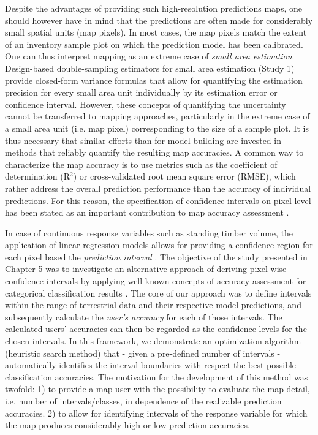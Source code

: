 Despite the advantages of providing such high-resolution predictions maps, one should however have in mind that the predictions are often made for considerably small spatial units (map pixels). In most cases, the map pixels match the extent of an inventory sample plot on which the prediction model has been calibrated. One can thus interpret mapping as an extreme case of \textit{small area estimation}. Design-based double-sampling estimators for small area estimation (Study 1) provide closed-form variance formulas that allow for quantifying the estimation precision for every small area unit individually by its estimation error or confidence interval. However, these concepts of quantifying the uncertainty cannot be transferred to mapping approaches, particularly in the extreme case of a small area unit (i.e. map pixel) corresponding to the size of a sample plot. It is thus necessary that similar efforts than for model building are invested in methods that reliably quantify the resulting map accuracies. A common way to characterize the map accuracy is to use metrics such as the coefficient of determination (R$^2$) or cross-validated root mean square error (RMSE), which rather address the overall prediction performance than the accuracy of individual predictions. For this reason, the specification of confidence intervals on pixel level has been stated as an important contribution to map accuracy assessment \citep{mcroberts2010a}.\par

In case of continuous response variables such as standing timber volume, the application of linear regression models allows for providing a confidence region for each pixel based the \textit{prediction interval} \citep[pp.136--139]{fahrmeir2013}. The objective of the study presented in Chapter 5 was to investigate an alternative approach of deriving pixel-wise confidence intervals by applying well-known concepts of accuracy assessment for categorical classification results \citep{congalton2008}. The core of our approach was to define intervals within the range of terrestrial data and their respective model predictions, and subsequently calculate the \textit{user's accuracy} for each of those intervals. The calculated users' accuracies can then be regarded as the confidence levels for the chosen intervals. In this framework, we demonstrate an optimization algorithm (heuristic search method) that - given a pre-defined number of intervals - automatically identifies the interval boundaries with respect the best possible classification accuracies. The motivation for the development of this method was twofold: 1) to provide a map user with the possibility to evaluate the map detail, i.e. number of intervals/classes, in dependence of the realizable prediction accuracies. 2) to allow for identifying intervals of the response variable for which the map produces considerably high or low prediction accuracies.\par 

